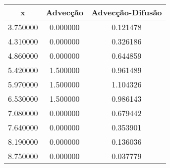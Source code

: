 \begin{tabular}{ccc}
\toprule
x & Advecção & Advecção-Difusão \\
\midrule
3.750000 & 0.000000 & 0.121478 \\
4.310000 & 0.000000 & 0.326186 \\
4.860000 & 0.000000 & 0.644859 \\
5.420000 & 1.500000 & 0.961489 \\
5.970000 & 1.500000 & 1.104326 \\
6.530000 & 1.500000 & 0.986143 \\
7.080000 & 0.000000 & 0.679442 \\
7.640000 & 0.000000 & 0.353901 \\
8.190000 & 0.000000 & 0.136036 \\
8.750000 & 0.000000 & 0.037779 \\
\bottomrule
\end{tabular}
